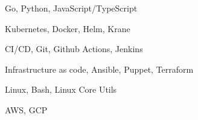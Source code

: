 \item Go, Python, JavaScript/TypeScript
\item Kubernetes, Docker, Helm, Krane
\item CI/CD, Git, Github Actions, Jenkins
\item Infrastructure as code, Ansible, Puppet, Terraform
\item Linux, Bash, Linux Core Utils
\item AWS, GCP
